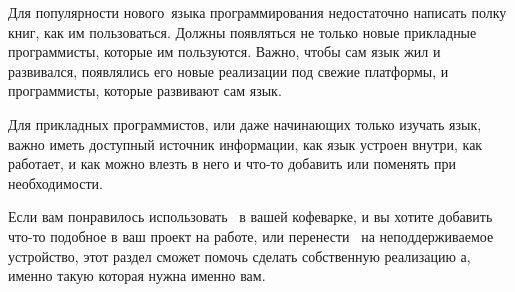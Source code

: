 \clearpage
Для популярности нового\ языка программирования недостаточно написать полку
книг, как им пользоваться. Должны появляться не только новые прикладные
программисты, которые им пользуются. Важно, чтобы сам язык жил и развивался,
появлялись его новые реализации под свежие платформы, и программисты, которые
развивают сам язык.

Для прикладных программистов, или даже начинающих только изучать язык, важно
иметь доступный источник информации, как язык устроен внутри, как работает, и как
можно влезть в него и что-то добавить или поменять при необходимости.

Если вам понравилось использовать \F\ в вашей кофеварке, и вы хотите добавить
что-то подобное в ваш проект на работе, или перенести \kf\ на неподдерживаемое
устройство, этот раздел сможет помочь сделать собственную реализацию \F а,
именно такую которая нужна именно вам.

